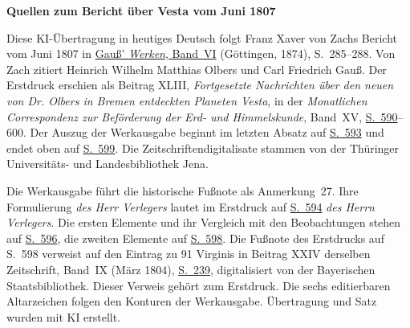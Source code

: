 \clearpage\thispagestyle{empty}
\begin{center}\textbf{Quellen zum Bericht über Vesta vom Juni 1807}\end{center}
\noindent Diese KI-Übertragung in heutiges Deutsch folgt Franz Xaver von Zachs Bericht vom Juni 1807 in \href{https://gdz.sub.uni-goettingen.de/id/PPN236007467}{Gauß’ \textit{Werken}, Band~VI} (Göttingen, 1874), S.~285--288. Von Zach zitiert Heinrich Wilhelm Matthias Olbers und Carl Friedrich Gauß. Der Erstdruck erschien als Beitrag XLIII, \textit{Fortgesetzte Nachrichten über den neuen von Dr. Olbers in Bremen entdeckten Planeten Vesta}, in der \textit{Monatlichen Correspondenz zur Beförderung der Erd- und Himmelskunde}, Band~XV, \href{https://zs.thulb.uni-jena.de/rsc/viewer/jportal_derivate_00237836/Monatliche_Correspondenz_130168688_15_1807_0597.tif}{S.~590}--600. Der Auszug der Werkausgabe beginnt im letzten Absatz auf \href{https://zs.thulb.uni-jena.de/rsc/viewer/jportal_derivate_00237836/Monatliche_Correspondenz_130168688_15_1807_0600.tif}{S.~593} und endet oben auf \href{https://zs.thulb.uni-jena.de/rsc/viewer/jportal_derivate_00237836/Monatliche_Correspondenz_130168688_15_1807_0606.tif}{S.~599}. Die Zeitschriftendigitalisate stammen von der Thüringer Universitäts- und Landesbibliothek Jena.
\par\medskip
Die Werkausgabe führt die historische Fußnote als Anmerkung~27. Ihre Formulierung \textit{des Herr Verlegers} lautet im Erstdruck auf \href{https://zs.thulb.uni-jena.de/rsc/viewer/jportal_derivate_00237836/Monatliche_Correspondenz_130168688_15_1807_0601.tif}{S.~594} \textit{des Herrn Verlegers}. Die ersten Elemente und ihr Vergleich mit den Beobachtungen stehen auf \href{https://zs.thulb.uni-jena.de/rsc/viewer/jportal_derivate_00237836/Monatliche_Correspondenz_130168688_15_1807_0603.tif}{S.~596}, die zweiten Elemente auf \href{https://zs.thulb.uni-jena.de/rsc/viewer/jportal_derivate_00237836/Monatliche_Correspondenz_130168688_15_1807_0605.tif}{S.~598}. Die Fußnote des Erstdrucks auf S.~598 verweist auf den Eintrag zu 91 Virginis in Beitrag XXIV derselben Zeitschrift, Band~IX (März 1804), \href{https://www.digitale-sammlungen.de/en/view/bsb10538601?page=253}{S.~239}, digitalisiert von der Bayerischen Staatsbibliothek. Dieser Verweis gehört zum Erstdruck. Die sechs editierbaren Altarzeichen folgen den Konturen der Werkausgabe. Übertragung und Satz wurden mit KI erstellt.
\clearpage
